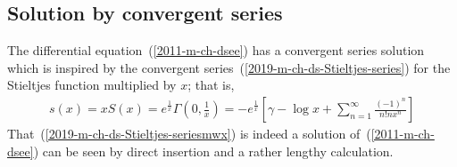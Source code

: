 \subsection*{Solution by convergent series}
The differential equation~(\ref{2011-m-ch-dsee}) has a convergent series solution
which is inspired by the convergent series~(\ref{2019-m-ch-ds-Stieltjes-series})  for the Stieltjes function
multiplied by $x$; that is,
\begin{equation}
\begin{split}
s(x) =x S(x)
=   e^\frac{1}{x}   \Gamma \left( 0, \frac{1}{x} \right)
=  - e^\frac{1}{x}   \left[  \gamma - \log x +\sum_{n=1}^\infty \frac{(-1)^n}{n!n x^n} \right]
\end{split}
\label{2019-m-ch-ds-Stieltjes-seriesmwx}
\end{equation}
That~(\ref{2019-m-ch-ds-Stieltjes-seriesmwx}) is indeed a solution of~(\ref{2011-m-ch-dsee})
can be seen by direct insertion and a rather lengthy calculation.




